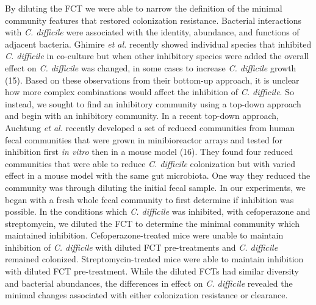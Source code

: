 \documentclass[
  12pt,
]{article}
\begin{document}
By diluting the FCT we were able to narrow the definition of the minimal
community features that restored colonization resistance. Bacterial
interactions with \emph{C. difficile} were associated with the identity,
abundance, and functions of adjacent bacteria. Ghimire \emph{et al.}
recently showed individual species that inhibited \emph{C. difficile} in
co-culture but when other inhibitory species were added the overall
effect on \emph{C. difficile} was changed, in some cases to increase
\emph{C. difficile} growth (15). Based on these observations from their
bottom-up approach, it is unclear how more complex combinations would
affect the inhibition of \emph{C. difficile}. So instead, we sought to
find an inhibitory community using a top-down approach and begin with an
inhibitory community. In a recent top-down approach, Auchtung \emph{et
al.} recently developed a set of reduced communities from human fecal
communities that were grown in minibioreactor arrays and tested for
inhibition first \emph{in vitro} then in a mouse model (16). They found
four reduced communities that were able to reduce \emph{C. difficile}
colonization but with varied effect in a mouse model with the same gut
microbiota. One way they reduced the community was through diluting the
initial fecal sample. In our experiments, we began with a fresh whole
fecal community to first determine if inhibition was possible. In the
conditions which \emph{C. difficile} was inhibited, with cefoperazone
and streptomycin, we diluted the FCT to determine the minimal community
which maintained inhibition. Cefoperazone-treated mice were unable to
maintain inhibition of \emph{C. difficile} with diluted FCT
pre-treatments and \emph{C. difficile} remained colonized.
Streptomycin-treated mice were able to maintain inhibition with diluted
FCT pre-treatment. While the diluted FCTs had similar diversity and
bacterial abundances, the differences in effect on \emph{C. difficile}
revealed the minimal changes associated with either colonization
resistance or clearance.
\end{document}
